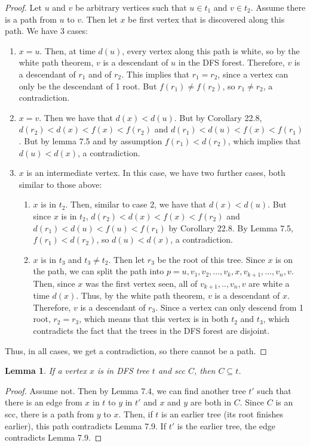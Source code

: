 \documentclass{article}
\newtheorem{lemma}[theorem]{Lemma}
\begin{document}
\begin{proof}
Let $u$ and $v$ be arbitrary vertices such that $u\in t_1$ and $v\in t_2$. Assume there is a path from $u$ to $v$. Then let $x$ be first vertex that is discovered along this path. We have 3 cases:
\begin{enumerate}
\item
$x = u$. Then, at time $d(u)$, every vertex along this path is white, so by the white path theorem, $v$ is a descendant of $u$ in the DFS forest. Therefore, $v$ is a descendant of $r_1$ and of $r_2$. This implies that $r_1=r_2$, since a vertex can only be the descendant of 1 root. But $f(r_1) \neq f(r_2)$, so $r_1\neq r_2$, a contradiction.
\item
$x=v$. Then we have that $d(x) < d(u)$. But by Corollary 22.8, $d(r_2) < d(x) < f(x) < f(r_2)$ and $d(r_1) < d(u) < f(x) < f(r_1)$. But by lemma 7.5 and by assumption $f(r_1) < d(r_2)$, which implies that $d(u) < d(x)$, a contradiction.
\item
$x$ is an intermediate vertex. In this case, we have two further cases, both similar to those above:
\begin{enumerate}
\item
$x$ is in $t_2$. Then, similar to case 2, we have that $d(x) < d(u)$. But since $x$ is in $t_2$, $d(r_2) < d(x) < f(x) < f(r_2)$ and $d(r_1) < d(u) < f(u) < f(r_1)$ by Corollary 22.8. By Lemma 7.5, $f(r_1) < d(r_2)$, so $d(u) < d(x)$, a contradiction.
\item
$x$ is in $t_3$ and $t_3\neq t_2$. Then let $r_3$ be the root of this tree. Since $x$ is on the path, we can split the path into $p = u, v_1, v_2, ..., v_k, x, v_{k+1}, ... ,v_n, v$. Then, since $x$ was the first vertex seen, all of $v_{k+1},..,v_n, v$ are white a time $d(x)$. Thus, by the white path theorem, $v$ is a descendant of $x$. Therefore, $v$ is a descendant of $r_3$. Since a vertex can only descend from 1 root, $r_2 = r_3$, which means that this vertex is in both $t_2$ and $t_3$, which contradicts the fact that the trees in the DFS forest are disjoint. 
\end{enumerate}
\end{enumerate}
Thus, in all cases, we get a contradiction, so there cannot be a path.
\end{proof}
\begin{lemma}
If a vertex $x$ is in DFS tree $t$ and scc $C$, then $C\subseteq t$.
\end{lemma}
\begin{proof}
Assume not. Then by Lemma 7.4, we can find another tree $t'$ such that there is an edge from $x$ in $t$ to $y$ in $t'$ and $x$ and $y$ are both in $C$. Since $C$ is an scc, there is a path from $y$ to $x$. Then, if $t$ is an earlier tree (its root finishes earlier), this path contradicts Lemma 7.9. If $t'$ is the earlier tree, the edge contradicts Lemma 7.9. 
\end{proof}
\end{document}
